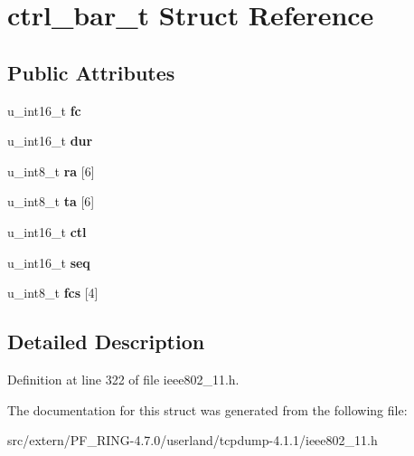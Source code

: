 \hypertarget{structctrl__bar__t}{
\section{ctrl\_\-bar\_\-t Struct Reference}
\label{structctrl__bar__t}
}
\subsection*{Public Attributes}
\begin{DoxyCompactItemize}
\item 
\hypertarget{structctrl__bar__t_a6e719dc6f90a87e06bf187a3bc3fb362}{
u\_\-int16\_\-t {\bfseries fc}}
\label{structctrl__bar__t_a6e719dc6f90a87e06bf187a3bc3fb362}

\item 
\hypertarget{structctrl__bar__t_ac46f33a3f8835d87c5d4ce0a90d63c66}{
u\_\-int16\_\-t {\bfseries dur}}
\label{structctrl__bar__t_ac46f33a3f8835d87c5d4ce0a90d63c66}

\item 
\hypertarget{structctrl__bar__t_a2cb3079c2515b691afda6beffd12a5ef}{
u\_\-int8\_\-t {\bfseries ra} \mbox{[}6\mbox{]}}
\label{structctrl__bar__t_a2cb3079c2515b691afda6beffd12a5ef}

\item 
\hypertarget{structctrl__bar__t_a39201e171bdda7036b69bfa208fab19c}{
u\_\-int8\_\-t {\bfseries ta} \mbox{[}6\mbox{]}}
\label{structctrl__bar__t_a39201e171bdda7036b69bfa208fab19c}

\item 
\hypertarget{structctrl__bar__t_af1a4042651640ebe4d33bc2b49b51ba8}{
u\_\-int16\_\-t {\bfseries ctl}}
\label{structctrl__bar__t_af1a4042651640ebe4d33bc2b49b51ba8}

\item 
\hypertarget{structctrl__bar__t_ab12bc45d524be53405fd9adc69569358}{
u\_\-int16\_\-t {\bfseries seq}}
\label{structctrl__bar__t_ab12bc45d524be53405fd9adc69569358}

\item 
\hypertarget{structctrl__bar__t_a0ea4ae79e5cc77fb93db39d5481a0fc4}{
u\_\-int8\_\-t {\bfseries fcs} \mbox{[}4\mbox{]}}
\label{structctrl__bar__t_a0ea4ae79e5cc77fb93db39d5481a0fc4}

\end{DoxyCompactItemize}


\subsection{Detailed Description}


Definition at line 322 of file ieee802\_\-11.h.



The documentation for this struct was generated from the following file:\begin{DoxyCompactItemize}
\item 
src/extern/PF\_\-RING-\/4.7.0/userland/tcpdump-\/4.1.1/ieee802\_\-11.h\end{DoxyCompactItemize}
